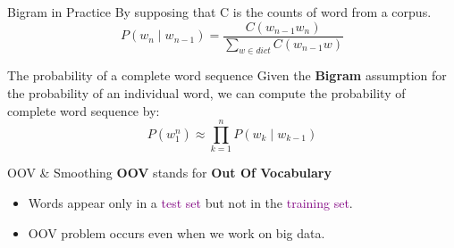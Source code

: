 \documentclass{beamer}
\begin{document}

\begin{frame}{Bigram in Practice}
By supposing that C is the counts of word from a corpus.
    $$P(w_n\mid w_{n-1}) = \frac{C(w_{n-1}w_n)}{\sum_{w\in dict}C(w_{n-1}w)}$$


\end{frame}


\begin{frame}{The probability of a complete word sequence}
    Given the \textbf{Bigram} assumption for the probability of an individual word, we can compute the probability of complete word sequence by:
    $$P(w_1^n) \approx \prod_{k=1}^nP(w_k\mid w_{k-1})$$

    \begin{block}{}
    \end{block}

\end{frame}


\begin{frame}{OOV \& Smoothing}
    \textbf{OOV} stands for \textbf{Out Of Vocabulary}\\
    \begin{itemize}
        \item Words appear only in a \textcolor{purple}{test set} but not in the \textcolor{purple}{training set}.
        \item OOV problem occurs even when we work on big data.
    \end{itemize}
\end{frame}
\end{document}
